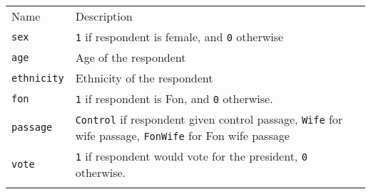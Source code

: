 \documentclass[]{article}
\begin{document}
\begin{longtable}[c]{@{}ll@{}}
\toprule\addlinespace
\begin{minipage}[b]{0.34\columnwidth}\raggedright
Name
\end{minipage} & \begin{minipage}[b]{0.59\columnwidth}\raggedright
Description
\end{minipage}
\\\addlinespace
\midrule\endhead
\begin{minipage}[t]{0.34\columnwidth}\raggedright
\texttt{sex}
\end{minipage} & \begin{minipage}[t]{0.59\columnwidth}\raggedright
\texttt{1} if respondent is female, and \texttt{0} otherwise
\end{minipage}
\\\addlinespace
\begin{minipage}[t]{0.34\columnwidth}\raggedright
\texttt{age}
\end{minipage} & \begin{minipage}[t]{0.59\columnwidth}\raggedright
Age of the respondent
\end{minipage}
\\\addlinespace
\begin{minipage}[t]{0.34\columnwidth}\raggedright
\texttt{ethnicity}
\end{minipage} & \begin{minipage}[t]{0.59\columnwidth}\raggedright
Ethnicity of the respondent
\end{minipage}
\\\addlinespace
\begin{minipage}[t]{0.34\columnwidth}\raggedright
\texttt{fon}
\end{minipage} & \begin{minipage}[t]{0.59\columnwidth}\raggedright
\texttt{1} if respondent is Fon, and \texttt{0} otherwise.
\end{minipage}
\\\addlinespace
\begin{minipage}[t]{0.34\columnwidth}\raggedright
\texttt{passage}
\end{minipage} & \begin{minipage}[t]{0.59\columnwidth}\raggedright
\texttt{Control} if respondent given control passage, \texttt{Wife} for
wife passage, \texttt{FonWife} for Fon wife passage
\end{minipage}
\\\addlinespace
\begin{minipage}[t]{0.34\columnwidth}\raggedright
\texttt{vote}
\end{minipage} & \begin{minipage}[t]{0.59\columnwidth}\raggedright
\texttt{1} if respondent would vote for the president, \texttt{0}
otherwise.
\end{minipage}
\\\addlinespace
\bottomrule
\end{longtable}
\end{document}
